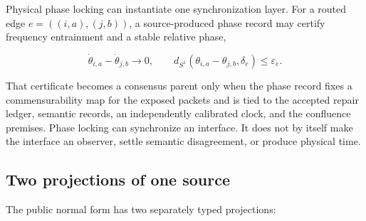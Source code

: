Physical phase locking can instantiate one synchronization layer. For a
routed edge \(e=((i,a),(j,b))\), a source-produced phase record may certify
frequency entrainment and a stable relative phase,

\[
\dot\theta_{i,a}-\dot\theta_{j,b}\longrightarrow0,
\qquad
d_{S^1}(\theta_{i,a}-\theta_{j,b},\delta_e)\le\varepsilon_e.
\]

That certificate becomes a consensus parent only when the phase record fixes
a commensurability map for the exposed packets and is tied to the accepted
repair ledger, semantic records, an independently calibrated clock, and the
confluence premises. Phase locking can synchronize an interface. It does not
by itself make the interface an observer, settle semantic disagreement, or
produce physical time.

\subsection*{Two projections of one source}

The public normal form has two separately typed projections:

